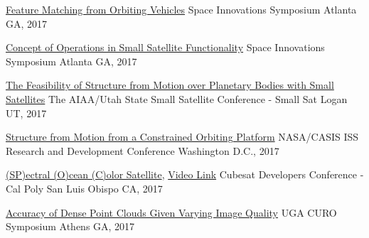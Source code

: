 \documentclass[10pt,a4paper]{article}
\begin{document}
\headedsection
  {{\color{bluegreen} \faMapO} \href{http://smallsat.uga.edu/images/documents/posters/Feature_Matching_from_Orbiting_Vehicles.pdf}{Feature Matching from Orbiting Vehicles}}{%
  \headedsubsection
    {Space Innovations Symposium}
    {Atlanta GA, 2017}
    {}
}

\headedsection
  {{\color{bluegreen} \faMapO} \href{http://smallsat.uga.edu/images/documents/posters/Symposium_for_Space_Innovations_Poster.pdf}{Concept of Operations in Small Satellite Functionality}}{%
  \headedsubsection
    {Space Innovations Symposium}
    {Atlanta GA, 2017}
    {}
}

\headedsection
  {{\color{bluegreen} \faTelevision} \href{http://smallsat.uga.edu/images/documents/presentations/Feasability_of_Structure_from_motion_over_planetary_bodies_using_small_satellites.pdf}{The Feasibility of Structure from Motion over Planetary Bodies with Small Satellites}}{%
  \headedsubsection
    {The AIAA/Utah State Small Satellite Conference - Small Sat}
    {Logan UT, 2017}
    {}
}

\headedsection
  {{\color{bluegreen} \faMapO} \href{http://smallsat.uga.edu/images/documents/posters/Structure_from_Motion_from_a_Constrained_Orbit.pdf}{Structure from Motion from a Constrained Orbiting Platform}}{%
  \headedsubsection
    {NASA/CASIS ISS Research and Development Conference}
    {Washington D.C., 2017}
    {}
}

\headedsection
  {{\color{bluegreen} \faTelevision} \href{http://smallsat.uga.edu/images/documents/presentations/UGAWorkshop2017CubeSatDeveloper.pdf}{(SP)ectral (O)cean (C)olor Satellite}, \href{https://youtu.be/QDb6PAgxWv0?t=9846}{ {\color{bluegreen} \faYoutubePlay} Video Link}}{%
  \headedsubsection
    {Cubesat Developers Conference - Cal Poly}
    {San Luis Obispo CA, 2017}
    {}
}

\headedsection
  {{\color{bluegreen} \faMapO} \href{http://smallsat.uga.edu/images/documents/posters/nirav_curo_poster.pdf}{Accuracy of Dense Point Clouds Given Varying Image Quality}}{%
  \headedsubsection
    {UGA CURO Symposium}
    {Athens GA, 2017}
    {}
}
\end{document}
